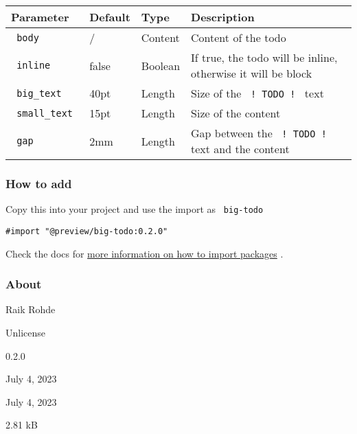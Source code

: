 \begin{longtable}[]{@{}llll@{}}
\toprule\noalign{}
Parameter & Default & Type & Description \\
\midrule\noalign{}
\endhead
\bottomrule\noalign{}
\endlastfoot
\texttt{\ body\ } & / & Content & Content of the todo \\
\texttt{\ inline\ } & false & Boolean & If true, the todo will be
inline, otherwise it will be block \\
\texttt{\ big\_text\ } & 40pt & Length & Size of the
\texttt{\ !\ TODO\ !\ } text \\
\texttt{\ small\_text\ } & 15pt & Length & Size of the content \\
\texttt{\ gap\ } & 2mm & Length & Gap between the
\texttt{\ !\ TODO\ !\ } text and the content \\
\end{longtable}

\subsubsection{How to add}\label{how-to-add}

Copy this into your project and use the import as \texttt{\ big-todo\ }

\begin{verbatim}
#import "@preview/big-todo:0.2.0"
\end{verbatim}



Check the docs for
\href{https://typst.app/docs/reference/scripting/\#packages}{more
information on how to import packages} .

\subsubsection{About}\label{about}

\begin{description}
\tightlist
\item[Author :]
Raik Rohde
\item[License:]
Unlicense
\item[Current version:]
0.2.0
\item[Last updated:]
July 4, 2023
\item[First released:]
July 4, 2023
\item[Archive size:]
2.81 kB
\href{https://packages.typst.org/preview/big-todo-0.2.0.tar.gz}{\pandocbounded{}}
\end{description}

